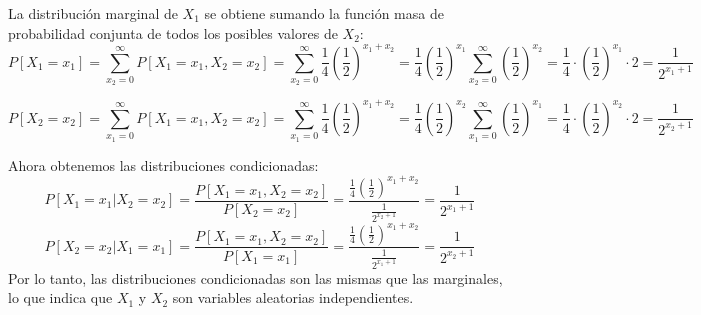 \begin{enumerate}[label=\color{red}\arabic*), leftmargin=*]
	La distribución marginal de $X_1$ se obtiene sumando la función masa de probabilidad conjunta de todos los posibles valores de $X_2$: \[
	P[X_1=x_1]=\sum_{x_2=0}^{\infty}P[X_1=x_1,X_2=x_2]=\sum_{x_2=0}^{\infty}\dfrac{1}{4}\left(\dfrac{1}{2}\right)^{x_1+x_2}=\dfrac{1}{4}\left(\dfrac{1}{2}\right)^{x_1}\sum_{x_2=0}^{\infty}\left(\dfrac{1}{2}\right)^{x_2}=\dfrac{1}{4}\cdot\left(\dfrac{1}{2}\right)^{x_1}\cdot2=\dfrac{1}{2^{x_1+1}}\]
	
	\[P[X_2=x_2]=\sum_{x_1=0}^{\infty}P[X_1=x_1,X_2=x_2]=\sum_{x_1=0}^{\infty}\dfrac{1}{4}\left(\dfrac{1}{2}\right)^{x_1+x_2}=\dfrac{1}{4}\left(\dfrac{1}{2}\right)^{x_2}\sum_{x_1=0}^{\infty}\left(\dfrac{1}{2}\right)^{x_1}=\dfrac{1}{4}\cdot\left(\dfrac{1}{2}\right)^{x_2}\cdot2=\dfrac{1}{2^{x_2+1}} \]
	
	Ahora obtenemos las distribuciones condicionadas:
	\[ P[X_1=x_1|X_2=x_2]=\dfrac{P[X_1=x_1,X_2=x_2]}{P[X_2=x_2]}=\dfrac{\frac{1}{4}\left(\frac{1}{2}\right)^{x_1+x_2}}{\frac{1}{2^{x_2+1}}}=\dfrac{1}{2^{x_1+1}} \]
	\[P[X_2=x_2|X_1=x_1]=\dfrac{P[X_1=x_1,X_2=x_2]}{P[X_1=x_1]}=\dfrac{\frac{1}{4}\left(\frac{1}{2}\right)^{x_1+x_2}}{\frac{1}{2^{x_1+1}}}=\dfrac{1}{2^{x_2+1}} \]
	Por lo tanto, las distribuciones condicionadas son las mismas que las marginales, lo que indica que $X_1$ y $X_2$ son variables aleatorias independientes.
\end{enumerate}